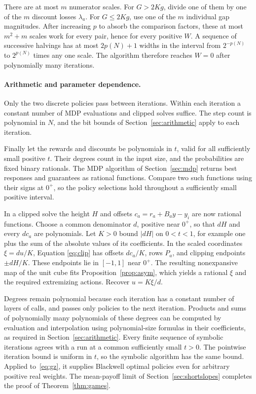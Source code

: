 There are at most \(m\) numerator scales. For \(G>2Kg\), divide one
of them by one of the \(m\) discount losses \(\lambda_a\). For
\(G\le2Kg\), use one of the \(m\) individual gap magnitudes. After
increasing \(p\) to absorb the comparison factors, these at most
\(m^2+m\) scales work for every pair, hence for every positive \(W\).
A sequence of successive halvings has at most \(2p(N)+1\) widths
in the interval from \(2^{-p(N)}\) to \(2^{p(N)}\) times any one scale.
The algorithm therefore reaches \(W=0\) after polynomially many
iterations.

\paragraph{Arithmetic and parameter dependence.}
Only the two discrete policies pass between iterations. Within each
iteration a constant number of MDP evaluations and clipped solves
suffice. The step count is polynomial in \(N\), and the bit bounds of
Section~\ref{sec:arithmetic} apply to each iteration.

Finally let the rewards and discounts be polynomials in \(t\), valid
for all sufficiently small positive \(t\). Their degrees count in the
input size, and the probabilities are fixed binary rationals. The MDP
algorithm of Section~\ref{sec:mdp} returns best responses and
guarantees as rational functions. Compare two such functions using
their signs at \(0^+\), so the policy selections hold throughout a
sufficiently small positive interval.

In a clipped solve the height \(H\) and offsets
\(c_a=r_a+B_a y-y_i\) are now rational functions. Choose a common
denominator \(d\), positive near \(0^+\), so that \(dH\) and every
\(dc_a\) are polynomials. Let \(K>0\) bound \(|dH|\) on \(0<t<1\),
for example one plus the sum of the absolute values of its
coefficients. In the scaled coordinates \(\xi=du/K\), Equation
\eqref{eq:clip} has offsets \(dc_a/K\), rows \(P_a\), and clipping
endpoints \(\pm dH/K\). These endpoints lie in \([-1,1]\) near
\(0^+\). The resulting nonexpansive map of the unit cube fits
Proposition~\ref{prop:asym}, which yields a rational \(\xi\) and the
required extremizing actions. Recover \(u=K\xi/d\).

Degrees remain polynomial because each iteration has a constant number
of layers of calls, and passes only policies to the next iteration.
Products and sums of polynomially many polynomials of these degrees
can be computed by evaluation and interpolation using polynomial-size
formulas in their coefficients, as required in
Section~\ref{sec:arithmetic}. Every finite sequence of symbolic
iterations agrees with a run at a common sufficiently small \(t>0\).
The pointwise iteration bound is uniform in \(t\), so the symbolic
algorithm has the same bound. Applied to~\eqref{eq:gz}, it supplies
Blackwell optimal policies even for arbitrary positive real weights.
The mean-payoff limit of Section~\ref{sec:shortslopes} completes the
proof of Theorem~\ref{thm:games}.
